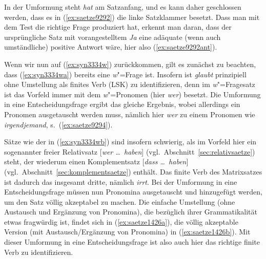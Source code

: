 \begin{exe}
\end{exe}

In der Umformung steht \textit{hat} am Satzanfang, und es kann daher geschlossen werden, dass es in (\ref{ex:saetze9292}) die linke Satzklammer besetzt.
Dass man mit dem Test die richtige Frage produziert hat, erkennt man daran, dass der ursprüngliche Satz mit vorangestelltem \textit{Ja} eine adäquate (wenn auch umständliche) positive Antwort wäre, hier also (\ref{ex:saetze9292ant}).

\begin{exe}
\end{exe}

Wenn wir nun auf (\ref{ex:syn3334w}) zurückkommen, gilt es zunächst zu beachten, dass (\ref{ex:syn3334wa}) bereits eine \textit{w}"=Frage ist.
Insofern ist \textit{glaubt} prinzipiell ohne Umstellung als finites Verb (LSK) zu identifizieren, denn im \textit{w}"=Fragesatz ist das Vorfeld immer mit dem \textit{w}"=Pro\-no\-men (hier \textit{wer}) besetzt.
Die Umformung in eine Entscheidungsfrage ergibt das gleiche Ergebnis, wobei allerdings ein Pronomen ausgetauscht werden muss, nämlich hier \textit{wer} zu einem Pronomen wie \textit{irgendjemand}, s.\ (\ref{ex:saetze9294}).

\begin{exe}
\end{exe}

Sätze wie der in (\ref{ex:syn3334wb}) sind insofern schwierig, als im Vorfeld hier ein sogenannter freier Relativsatz [\textit{wer \ldots\ haben}] (vgl.\ Abschnitt~\ref{sec:relativsaetze}) steht, der wiederum einen Komplementsatz [\textit{dass \ldots\ haben}] (vgl.\ Abschnitt~\ref{sec:komplementsaetze}) enthält.
Das finite Verb des Matrixsatzes ist dadurch das insgesamt dritte, nämlich \textit{irrt}.
Bei der Umformung in eine Entscheidungsfrage müssen nun Pronomina ausgetauscht und hinzugefügt werden, um den Satz völlig akzeptabel zu machen.
Die einfache Umstellung (ohne Austausch und Ergänzung von Pronomina), die bezüglich ihrer Grammatikalität etwas fragwürdig ist, findet sich in (\ref{ex:saetze1426a}), die völlig akzeptable Version (mit Austausch\slash Ergänzung von Pronomina) in (\ref{ex:saetze1426b}).
Mit dieser Umformung in eine Entscheidungsfrage ist also auch hier das richtige finite Verb zu identifizieren.

